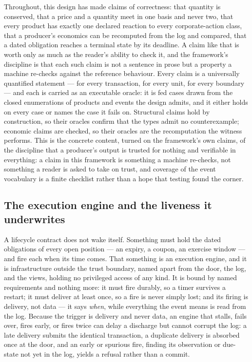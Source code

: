 Throughout, this design has made claims of correctness: that quantity is conserved,
that a price and a quantity meet in one basis and never two, that every product has
exactly one declared reaction to every corporate-action class, that a producer's
economics can be recomputed from the log and compared, that a dated obligation
reaches a terminal state by its deadline. A claim like that is worth only as much as
the reader's ability to check it, and the framework's discipline is that each such
claim is not a sentence in prose but a property a machine re-checks against the
reference behaviour. Every claim is a universally quantified statement --- for every
transaction, for every unit, for every boundary --- and each is carried as an
executable oracle: it is fed cases drawn from the closed enumerations of products and
events the design admits, and it either holds on every case or names the case it
fails on. Structural claims hold by construction, so their oracles confirm that the
types admit no counterexample; economic claims are checked, so their oracles are the
recomputation the witness performs. This is the concrete content, turned on the
framework's own claims, of the discipline that a producer's output is trusted for
nothing and verifiable in everything: a claim in this framework is something a
machine re-checks, not something a reader is asked to take on trust, and coverage of
the event vocabulary is a finite checklist rather than a hope that testing found the
corner.

\subsection{The execution engine and the liveness it underwrites}

A lifecycle contract does not wake itself. Something must hold the dated
obligations of every open position --- an expiry, a coupon, an exercise window ---
and fire each when its time comes. That something is an execution engine, and it is
infrastructure outside the trust boundary, named apart from the door, the log, and
the views, holding no privileged access of any kind. It is bound by named
requirements and nothing more: it must fire durably, so a timer survives a restart;
it must deliver at least once, so a fire is never simply lost; and its firing is
delivery, not data --- it says \emph{when}, while everything the event means is read
from the log. Because the trigger is delivery and never data, an engine that stalls,
fails over, fires early, or fires twice can delay a discharge but cannot corrupt the
log: a late delivery submits the identical transaction, a duplicate delivery is
absorbed once at the door, and an early or spurious fire, finding its observation or
due-state not yet in the log, yields a refusal rather than a commit.

